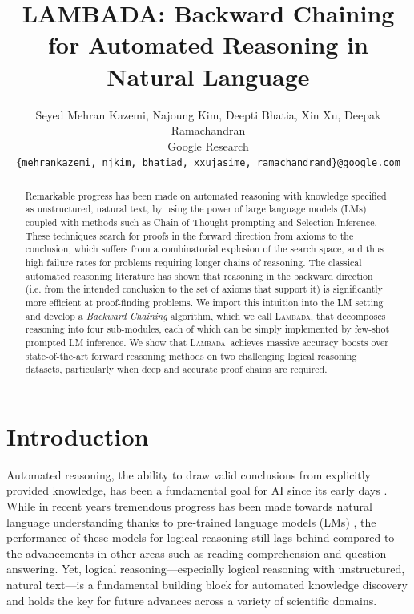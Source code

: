 \documentclass[11pt]{article}
\title{LAMBADA: Backward Chaining for Automated Reasoning in Natural Language}
\author{Seyed Mehran Kazemi, Najoung Kim, Deepti Bhatia, Xin Xu, Deepak Ramachandran \\
  Google Research \\
  \texttt{\{mehrankazemi, njkim, bhatiad, xxujasime, ramachandrand\}@google.com}}
\newcommand{\algo}{\textsc{Lambada}}
\begin{document}
\maketitle
\begin{abstract}
Remarkable progress has been made on automated reasoning with knowledge specified as unstructured, natural text, by
using the power of large language models (LMs) coupled with methods such as Chain-of-Thought prompting and Selection-Inference. These techniques search for proofs in the forward direction from axioms to the conclusion, which suffers from a combinatorial explosion of the search space, and thus high failure rates for problems requiring longer chains of reasoning. The classical automated reasoning literature has shown that reasoning in the backward direction (i.e. from the intended conclusion to the set of axioms that support it) is significantly more efficient at proof-finding problems. 
We import this intuition into the LM setting and develop a \emph{Backward Chaining} algorithm, which we call \algo, that decomposes reasoning into four sub-modules, each of which can be simply implemented by few-shot prompted LM inference.
We show that \algo\ achieves massive accuracy boosts over state-of-the-art forward reasoning methods on two challenging logical reasoning datasets, particularly when deep and accurate proof chains are required.
\end{abstract}

\section{Introduction}
Automated reasoning, the ability to draw valid conclusions from explicitly provided knowledge, has been a fundamental goal for AI since its early days \cite{mccarthy1960programs,hewitt1969planner}. While in recent years tremendous progress has been made towards natural language understanding thanks to pre-trained language models (LMs) \cite{brown2020language,chowdhery2022palm}, the performance of these models for logical reasoning still lags behind \cite{rae2021scaling,creswell2022selection} compared to the advancements in other areas such as reading comprehension and question-answering. Yet, logical reasoning---especially logical reasoning with unstructured, natural text---is a fundamental building block for automated knowledge discovery and holds the key for future advances across a variety of scientific domains.
\end{document}
